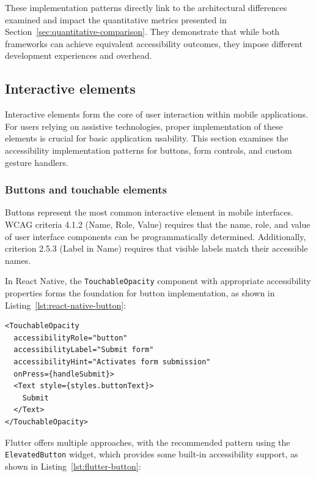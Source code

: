 These implementation patterns directly link to the architectural differences examined and impact the quantitative metrics presented in Section~\ref{sec:quantitative-comparison}. They demonstrate that while both frameworks can achieve equivalent accessibility outcomes, they impose different development experiences and overhead.

\subsection{Interactive elements}
\label{subsec:interactive-elements}

Interactive elements form the core of user interaction within mobile applications. For users relying on assistive technologies, proper implementation of these elements is crucial for basic application usability. This section examines the accessibility implementation patterns for buttons, form controls, and custom gesture handlers.

\subsubsection{Buttons and touchable elements}
\label{subsubsec:buttons-implementation}

Buttons represent the most common interactive element in mobile interfaces. WCAG criteria 4.1.2 (Name, Role, Value) requires that the name, role, and value of user interface components can be programmatically determined. Additionally, criterion 2.5.3 (Label in Name) requires that visible labels match their accessible names.

In React Native, the \texttt{TouchableOpacity} component with appropriate accessibility properties forms the foundation for button implementation, as shown in Listing~\ref{lst:react-native-button}:

\begin{lstlisting}[style=ReactNativeStyle, caption=Accessible button in React Native, label=lst:react-native-button]
<TouchableOpacity
  accessibilityRole="button"
  accessibilityLabel="Submit form"
  accessibilityHint="Activates form submission"
  onPress={handleSubmit}>
  <Text style={styles.buttonText}>
    Submit
  </Text>
</TouchableOpacity>
\end{lstlisting}

Flutter offers multiple approaches, with the recommended pattern using the \texttt{ElevatedButton} widget, which provides some built-in accessibility support, as shown in Listing~\ref{lst:flutter-button}:

